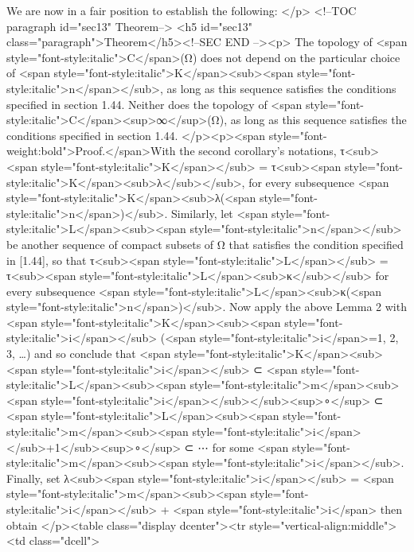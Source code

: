 {{{{We are now in a fair position to establish the following:
</p>
<!--TOC paragraph id="sec13" Theorem-->
<h5 id="sec13" class="paragraph">Theorem</h5><!--SEC END --><p> 
The topology of <span style="font-style:italic">C</span>(Ω) does not depend on the particular choice of 
{<span style="font-style:italic">K</span><sub><span style="font-style:italic">n</span></sub>}, as long as this sequence satisfies the conditions 
specified in section 1.44. Neither does the topology of <span style="font-style:italic">C</span><sup>∞</sup>(Ω), 
as long as this sequence satisfies the conditions specified in section 1.44.
</p><p><span style="font-weight:bold">Proof.</span>With the second corollary’s notations,
τ<sub><span style="font-style:italic">K</span></sub> = τ<sub><span style="font-style:italic">K</span><sub>λ</sub></sub>,
for every subsequence {<span style="font-style:italic">K</span><sub>λ(<span style="font-style:italic">n</span>)</sub>}.
Similarly, let 
{<span style="font-style:italic">L</span><sub><span style="font-style:italic">n</span></sub>} 
be another sequence of compact subsets of Ω that satisfies 
the condition specified in [1.44], 
so that 
τ<sub><span style="font-style:italic">L</span></sub> = τ<sub><span style="font-style:italic">L</span><sub>κ</sub></sub>
for every subsequence {<span style="font-style:italic">L</span><sub>κ(<span style="font-style:italic">n</span>)</sub>}. 
Now apply the above Lemma 2 with <span style="font-style:italic">K</span><sub><span style="font-style:italic">i</span></sub> (<span style="font-style:italic">i</span>=1, 2, 3, …) and so conclude that 
<span style="font-style:italic">K</span><sub><span style="font-style:italic">i</span></sub> 
⊂ 
<span style="font-style:italic">L</span><sub><span style="font-style:italic">m</span><sub><span style="font-style:italic">i</span></sub></sub><sup>∘</sup> 
⊂ 
<span style="font-style:italic">L</span><sub><span style="font-style:italic">m</span><sub><span style="font-style:italic">i</span></sub>+1</sub><sup>∘</sup>
⊂
⋯
for some <span style="font-style:italic">m</span><sub><span style="font-style:italic">i</span></sub>. Finally, set λ<sub><span style="font-style:italic">i</span></sub> = <span style="font-style:italic">m</span><sub><span style="font-style:italic">i</span></sub> + <span style="font-style:italic">i</span> then obtain 
</p><table class="display dcenter"><tr style="vertical-align:middle"><td class="dcell">
     

}}}}
